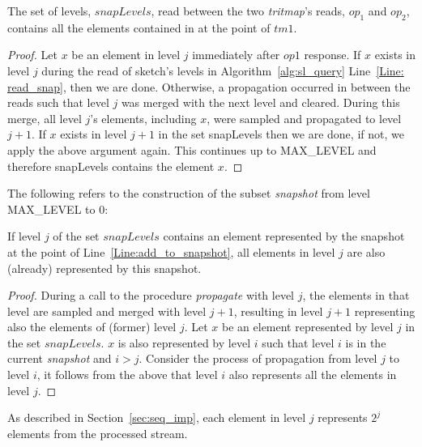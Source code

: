 \begin{lemma}\label{Lem: snap_no_miss}
The set of levels, $snapLevels$, read between the two \emph{tritmap}'s reads, $op_1$ and $op_2$, contains all the elements contained in \mysketch at the point of $tm1$. 
\end{lemma}
\begin{proof}
Let $x$ be an element in level $j$ immediately after $op1$ response.
If $x$ exists in level $j$ during the read of sketch's levels in Algorithm~\ref{alg:sl_query} Line~\ref{Line: read_snap}, then we are done.
Otherwise, a propagation occurred in between the reads such that level $j$ was merged with the next level and cleared. During this merge, all level $j$'s elements, including $x$, were sampled and propagated to level $j+1$. If $x$ exists in level $j+1$ in the set 
snapLevels then we are done, if not, we apply the above argument again. This continues up to MAX\_LEVEL and therefore snapLevels contains the element $x$.
\end{proof}

The following refers to the construction of the subset \emph{snapshot} from level MAX\_LEVEL to 0:

\begin{lemma} \label{Lem: all_dup}
If level $j$ of the set $snapLevels$ contains an element represented by the snapshot at the point of Line~\ref{Line:add_to_snapshot}, all elements in level $j$ are also (already) represented by this snapshot.
\end{lemma}
\begin{proof}
During a call to the procedure \emph{propagate} with level $j$, the elements in that level are sampled and merged with level $j+1$, resulting in level $j+1$ representing also the elements of (former) level $j$.
Let $x$ be an element represented by level $j$ in the set $snapLevels$.
$x$ is also represented by level $i$ such that level $i$ is in the current \emph{snapshot} and $i>j$. Consider the process of propagation from level $j$ to level $i$, it follows from the above that level $i$ also represents all the elements in level $j$.
\end{proof}

As described in Section~\ref{sec:seq_imp}, each element in level $j$ represents $2^j$ elements from the processed stream.

